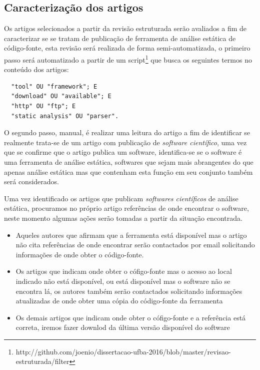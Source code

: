 \documentclass[qual, classic, a4paper]{ufbathesis}
\begin{document}
\subsection{Caracterização dos artigos}

Os artigos selecionados a partir da revisão estruturada serão avaliados a fim
de caracterizar se se tratam de publicação de ferramenta de análise estática
de código-fonte, esta revisão será realizada de forma semi-automatizada, o
primeiro passo será automatizado a partir de um
script\footnote{http://github.com/joenio/dissertacao-ufba-2016/blob/master/revisao-estruturada/filter}
que busca os seguintes termos no conteúdo dos artigos:

\begin{verbatim}
  "tool" OU "framework"; E
  "download" OU "available"; E
  "http" OU "ftp"; E
  "static analysis" OU "parser".
\end{verbatim}

O segundo passo, manual, é realizar uma leitura do artigo a fim de identificar
se realmente trata-se de um artigo com publicação de {\it software
científico}, uma vez que se confirme que o artigo publica um software,
identifica-se se o software é uma ferramenta de análise estática, softwares
que sejam mais abrangentes do que apenas análise estática mas que contenham
esta função em seu conjunto também será considerados.

Uma vez identificado os artigos que publicam {\it softwares científicos} de
análise estática, procuramos no próprio artigo referências de onde encontrar o
software, neste momento algumas ações serão tomadas a partir da situação
encontrada.

\begin{itemize}

  \item Aqueles autores que afirmam que a ferramenta está disponível mas o
    artigo não cita referências de onde encontrar serão contactados por email
    solicitando informações de onde obter o código-fonte.

  \item Os artigos que indicam onde obter o cófigo-fonte mas o acesso ao local
    indicado não está disponível, ou está disponível mas o software não se
    encontra lá, os autores também serão contactados solicitando informações
    atualizadas de onde obter uma cópia do código-fonte da ferramenta

  \item Os demais artigos que indicam onde obter o cófigo-fonte e a referência
    está correta, iremos fazer downlod da última versão disponível do software

\end{itemize}
\end{document}
